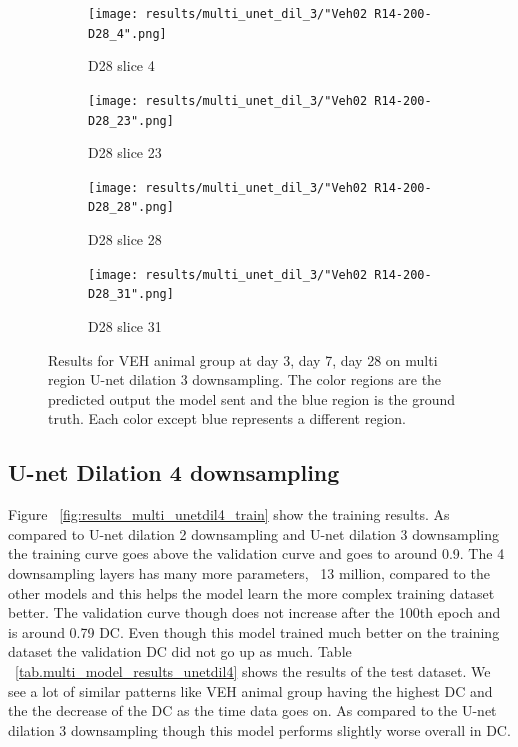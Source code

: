 \begin{figure}[!htb]
\medskip
\begin{subfigure}{0.25\textwidth}
  \texttt{[image: results/multi\_unet\_dil\_3/"Veh02 R14-200-D28\_4".png]}
  \caption{D28 slice 4}
\end{subfigure}\hfil %
\begin{subfigure}{0.25\textwidth}
  \texttt{[image: results/multi\_unet\_dil\_3/"Veh02 R14-200-D28\_23".png]}
  \caption{D28 slice 23}
\end{subfigure}\hfil %
\begin{subfigure}{0.25\textwidth}
  \texttt{[image: results/multi\_unet\_dil\_3/"Veh02 R14-200-D28\_28".png]}
  \caption{D28 slice 28}
\end{subfigure}\hfil %
\begin{subfigure}{0.25\textwidth}
  \texttt{[image: results/multi\_unet\_dil\_3/"Veh02 R14-200-D28\_31".png]}
  \caption{D28 slice 31}
\end{subfigure}
  
  \caption{Results for VEH animal group at day 3, day 7, day 28 on multi region U-net dilation 3 downsampling. The color regions are the predicted output the model sent and the blue region is the ground truth. Each color except blue represents a different region.}
  \label{fig:results_multi_unetdil3_VEH}
\end{figure}




\subsection{U-net Dilation 4 downsampling}
Figure ~\ref{fig:results_multi_unetdil4_train} show the training results. 
As compared to U-net dilation 2 downsampling and U-net dilation 3 downsampling the training curve goes above the validation curve and goes to around 0.9. 
The 4 downsampling layers has many more parameters, ~13 million, compared to the other models and this helps the model learn the more complex training dataset better.
The validation curve though does not increase after the 100th epoch and is around 0.79 DC. 
Even though this model trained much better on the training dataset the validation DC did not go up as much. 
Table ~\ref{tab.multi_model_results_unetdil4} shows the results of the test dataset.
We see a lot of similar patterns like VEH animal group having the highest DC and the the decrease of the DC as the time data goes on. 
As compared to the U-net dilation 3 downsampling though this model performs slightly worse overall in DC.



